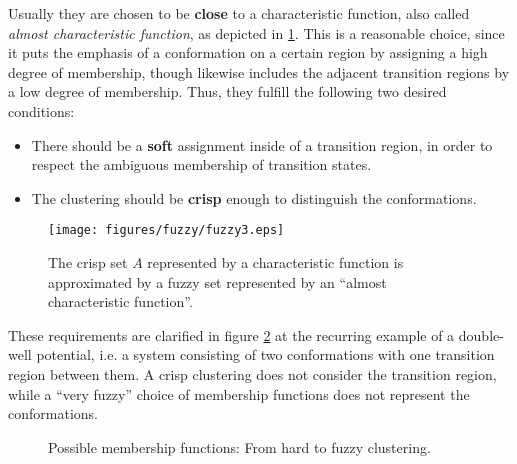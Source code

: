 Usually they are chosen to be \textbf{close} to a characteristic function, also called \textit{almost characteristic function}, as depicted in \ref{fig:fuzzy}.
This is a reasonable choice, since it puts the emphasis of a conformation on a certain region by assigning a high degree of membership,
though likewise includes the adjacent transition regions by a low degree of membership.
Thus, they fulfill the following two desired conditions:
\begin{itemize}
\item There should be a \textbf{soft} assignment inside of a transition region, in order to respect the ambiguous membership of transition states.
\item The clustering should be \textbf{crisp} enough to distinguish the conformations.
\end{itemize}

\begin{figure}[!ht]
	\centering
	\texttt{[image: figures/fuzzy/fuzzy3.eps]}
 	\caption{The crisp set $A$ represented by a characteristic function is approximated by a fuzzy set represented by an ``almost characteristic function''.}
        \label{fig:fuzzy}
\end{figure}

These requirements are clarified in figure \ref{fig:membership} at the recurring example of a double-well potential, i.e. a system consisting of two conformations with one transition region between them. A crisp clustering does not consider the transition region, while a ``very fuzzy'' choice of membership functions does not represent the conformations.

\begin{figure}
	\centering
	\caption{Possible membership functions: From hard to fuzzy clustering.}
	\label{fig:membership}
\end{figure}

